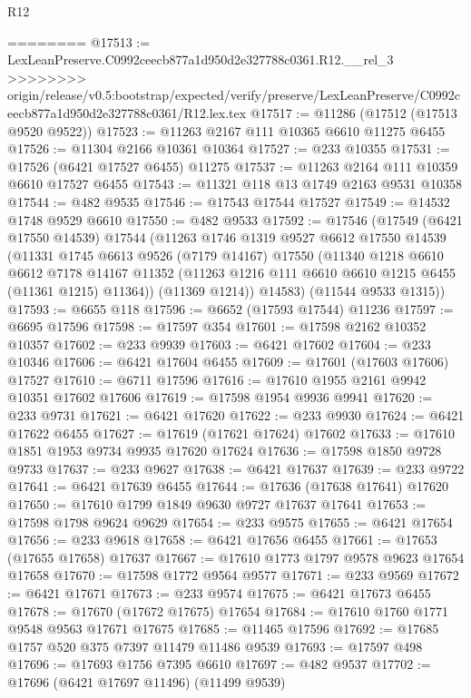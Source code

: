 \begin{lexlean}{R12}
\begin{coremodule}
{{{{{{{{{{{{{{{{{{{{{{{{{{{{{{{{{{{{{{{{{{{{{{{{{{{{{{{{{{{{{{{{{{{{{{{{{{{{{{{{{{========
@17513 := LexLeanPreserve.C0992ceecb877a1d950d2e327788c0361.R12.__rel_3
>>>>>>>> origin/release/v0.5:bootstrap/expected/verify/preserve/LexLeanPreserve/C0992ceecb877a1d950d2e327788c0361/R12.lex.tex
@17517 := @11286 (@17512 (@17513 @9520 @9522))
@17523 := @11263 @2167 @111 @10365 @6610 @11275 @6455
@17526 := @11304 @2166 @10361 @10364
@17527 := @233 @10355
@17531 := @17526 (@6421 @17527 @6455) @11275
@17537 := @11263 @2164 @111 @10359 @6610 @17527 @6455
@17543 := @11321 @118 @13 @1749 @2163 @9531 @10358
@17544 := @482 @9535
@17546 := @17543 @17544 @17527
@17549 := @14532 @1748 @9529 @6610
@17550 := @482 @9533
@17592 := @17546
    (@17549
      (@6421 @17550 @14539)
      @17544
      (@11263
        @1746
        @1319
        @9527
        @6612
        @17550
        @14539
        (@11331
          @1745
          @6613
          @9526
          (@7179 @14167)
          @17550
          (@11340
            @1218
            @6610
            @6612
            @7178
            @14167
            @11352
            (@11263 @1216 @111 @6610 @6610 @1215 @6455 (@11361 @1215) @11364))
          (@11369 @1214))
        @14583)
      (@11544 @9533 @1315))
@17593 := @6655 @118
@17596 := @6652 (@17593 @17544) @11236
@17597 := @6695 @17596
@17598 := @17597 @354
@17601 := @17598 @2162 @10352 @10357
@17602 := @233 @9939
@17603 := @6421 @17602
@17604 := @233 @10346
@17606 := @6421 @17604 @6455
@17609 := @17601 (@17603 @17606) @17527
@17610 := @6711 @17596
@17616 := @17610 @1955 @2161 @9942 @10351 @17602 @17606
@17619 := @17598 @1954 @9936 @9941
@17620 := @233 @9731
@17621 := @6421 @17620
@17622 := @233 @9930
@17624 := @6421 @17622 @6455
@17627 := @17619 (@17621 @17624) @17602
@17633 := @17610 @1851 @1953 @9734 @9935 @17620 @17624
@17636 := @17598 @1850 @9728 @9733
@17637 := @233 @9627
@17638 := @6421 @17637
@17639 := @233 @9722
@17641 := @6421 @17639 @6455
@17644 := @17636 (@17638 @17641) @17620
@17650 := @17610 @1799 @1849 @9630 @9727 @17637 @17641
@17653 := @17598 @1798 @9624 @9629
@17654 := @233 @9575
@17655 := @6421 @17654
@17656 := @233 @9618
@17658 := @6421 @17656 @6455
@17661 := @17653 (@17655 @17658) @17637
@17667 := @17610 @1773 @1797 @9578 @9623 @17654 @17658
@17670 := @17598 @1772 @9564 @9577
@17671 := @233 @9569
@17672 := @6421 @17671
@17673 := @233 @9574
@17675 := @6421 @17673 @6455
@17678 := @17670 (@17672 @17675) @17654
@17684 := @17610 @1760 @1771 @9548 @9563 @17671 @17675
@17685 := @11465 @17596
@17692 := @17685 @1757 @520 @375 @7397 @11479 @11486 @9539
@17693 := @17597 @498
@17696 := @17693 @1756 @7395 @6610
@17697 := @482 @9537
@17702 := @17696 (@6421 @17697 @11496) (@11499 @9539)
}}}}}}}}}}}}}}}}}}}}}}}}}}}}}}}}}}}}}}}}}}}}}}}}}}}}}}}}}}}}}}}}}}}}}}}}}}}}}}}}}}
\end{coremodule}
\end{lexlean}
